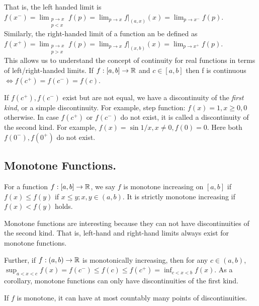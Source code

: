 That is, the left handed limit is\\
$f(x^-) = \lim_{\substack{p\to x\\p<x}}f(p)=\lim_{p\to x}f\big\rvert_{(a,x)}(x)=\lim_{p\to x^-}f(p)$.\\
Similarly, the right-handed limit of a function an be defined as
$f(x^+) = \lim_{\substack{p\to x\\p>x}}f(p)=\lim_{p\to x}f\big\rvert_{(x,b)}(x)=\lim_{p\to x^+}f(p)$.\\
This allows us to understand the concept of continuity for real functions in terms of left/right-handed limits.
If $f:[a,b]\to \mathbb{R}$ and $c\in[a,b]$ then f is continuous $\iff f(c^+)=f(c^-)=f(c)$.

If $f(c^+),f(c^-)$ exist but are not equal, we have a discontinuity of the \emph{first kind}, or a simple discontinuity.
For example, step function: $f(x)=1, x\geq0, 0$ otherwise. 
In case $f(c^+)$ or $f(c^-)$ do not exist, it is called a discontinuity of the second kind.
For example, $f(x)=\sin{1/x}, x\neq0, f(0)=0$.
Here both $f(0^-),f(0^+)$ do not exist.

\subsection{Monotone Functions.}
For a function $f:[a,b]\to\mathbb{R}$, we say $f$ is monotone increasing on $[a,b]$ if $f(x)\leq f(y)$ if $x\leq y;x,y\in(a,b)$.
It is strictly monotone increasing if $f(x)<f(y)$ holds.

Monotone functions are interesting because they can not have discontinuities of the second kind.
That is, left-hand and right-hand limits always exist for monotone functions.

Further, if $f:(a,b)\to\mathbb{R}$ is monotonically increasing, then for any $c\in(a,b)$, $\sup_{a<x<c}f(x)=f(c^-)\leq f(c)\leq f(c^+)=\inf_{c<x<b}f(x)$.
As a corollary, monotone functions can only have discontinuities of the first kind.

\begin{remark}
If $f$ is monotone, it can have at most countably many points of discontinuities.
\end{remark}
